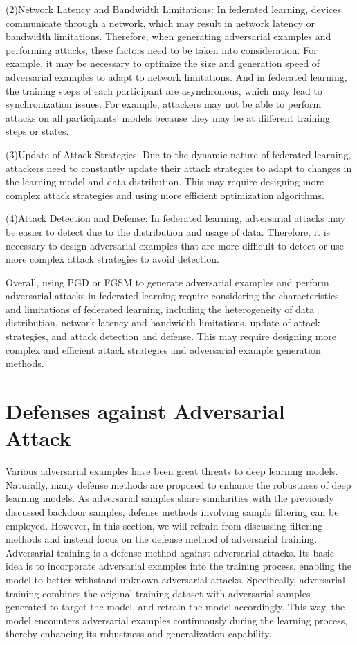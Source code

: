 \documentclass[pdflatex,sn-mathphys-num]{sn-jnl}%
\theoremstyle{thmstyleone}%
\theoremstyle{thmstyletwo}%
\theoremstyle{thmstylethree}%
\begin{document}
(2)Network Latency and Bandwidth Limitations:
In federated learning, devices communicate through a
network, which may result in network latency or
bandwidth limitations. Therefore, when generating adversarial
examples and performing attacks, these factors need to
be taken into consideration. For example, it may be
necessary to optimize the size and generation speed of
adversarial examples to adapt to network limitations. And
in federated learning, the training steps of each participant
are asynchronous, which may lead to synchronization
issues. For example, attackers may not be able to perform
attacks on all participants' models because they may be
at different training steps or states.

(3)Update of Attack Strategies: Due to the dynamic
nature of federated learning, attackers need to constantly
update their attack strategies to adapt to changes in the
learning model and data distribution. This may require
designing more complex attack strategies and using more
eﬀicient optimization algorithms.

(4)Attack Detection and Defense: In federated learning,
adversarial attacks may be easier to detect due to the
distribution and usage of data. Therefore, it is necessary
to design adversarial examples that are more diﬀicult to
detect or use more complex attack strategies to avoid
detection.

Overall, using PGD or FGSM to generate adversarial
examples and perform adversarial attacks in federated
learning require considering the characteristics and limitations of federated learning, including the heterogeneity
of data distribution, network latency and bandwidth limitations,
update of attack strategies, and attack detection
and defense. This may require designing more complex
and eﬀicient attack strategies and adversarial example
generation methods.

\section{Defenses against Adversarial Attack}
\label{Defenses against Adversarial Attack}
Various adversarial examples have been great threats to
deep learning models. Naturally, many defense methods
are proposed to enhance the robustness of deep learning
models. As adversarial samples share similarities with the
previously discussed backdoor samples, defense methods
involving sample filtering can be employed. However, in
this section, we will refrain from discussing filtering methods and instead focus on the defense method of adversarial
training. Adversarial training is a defense method against
adversarial attacks. Its basic idea is to incorporate
adversarial examples into the training process, enabling the
model to better withstand unknown adversarial attacks.
Specifically, adversarial training combines the original
training dataset with adversarial samples generated to
target the model, and retrain the model accordingly. This
way, the model encounters adversarial examples
continuously during the learning process, thereby enhancing
its robustness and generalization capability.
\end{document}

